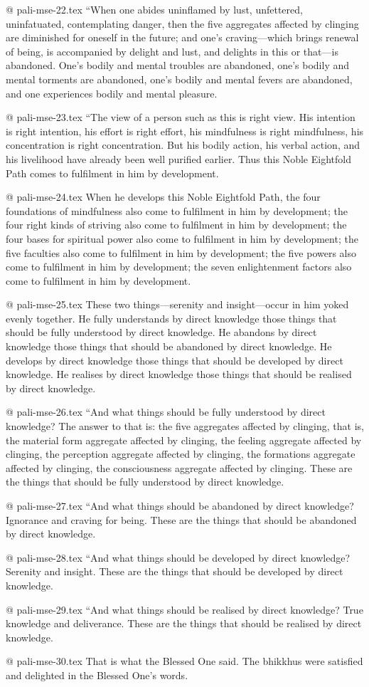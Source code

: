 @ pali-mse-22.tex
“When one abides uninflamed by lust, unfettered, uninfatuated, contemplating danger, then the five aggregates affected by clinging are diminished for oneself in the future; and one’s craving—which brings renewal of being, is accompanied by delight and lust, and delights in this or that—is abandoned. One’s bodily and mental troubles are abandoned, one’s bodily and mental torments are abandoned, one’s bodily and mental fevers are abandoned, and one experiences bodily and mental pleasure.

@ pali-mse-23.tex
“The view of a person such as this is right view. His intention is right intention, his effort is right effort, his mindfulness is right mindfulness, his concentration is right concentration. But his bodily action, his verbal action, and his livelihood have already been well purified earlier. Thus this Noble Eightfold Path comes to fulfilment in him by development.

@ pali-mse-24.tex
When he develops this Noble Eightfold Path, the four foundations of mindfulness also come to fulfilment in him by development; the four right kinds of striving also come to fulfilment in him by development; the four bases for spiritual power also come to fulfilment in him by development; the five faculties also come to fulfilment in him by development; the five powers also come to fulfilment in him by development; the seven enlightenment factors also come to fulfilment in him by development.

@ pali-mse-25.tex
These two things—serenity and insight—occur in him yoked evenly together. He fully understands by direct knowledge those things that should be fully understood by direct knowledge. He abandons by direct knowledge those things that should be abandoned by direct knowledge. He develops by direct knowledge those things that should be developed by direct knowledge. He realises by direct knowledge those things that should be realised by direct knowledge.

@ pali-mse-26.tex
“And what things should be fully understood by direct knowledge? The answer to that is: the five aggregates affected by clinging, that is, the material form aggregate affected by clinging, the feeling aggregate affected by clinging, the perception aggregate affected by clinging, the formations aggregate affected by clinging, the consciousness aggregate affected by clinging. These are the things that should be fully understood by direct knowledge.

@ pali-mse-27.tex
“And what things should be abandoned by direct knowledge? Ignorance and craving for being. These are the things that should be abandoned by direct knowledge.

@ pali-mse-28.tex
“And what things should be developed by direct knowledge? Serenity and insight. These are the things that should be developed by direct knowledge.

@ pali-mse-29.tex
“And what things should be realised by direct knowledge? True knowledge and deliverance. These are the things that should be realised by direct knowledge.

@ pali-mse-30.tex
That is what the Blessed One said. The bhikkhus were satisfied and delighted in the Blessed One’s words.
